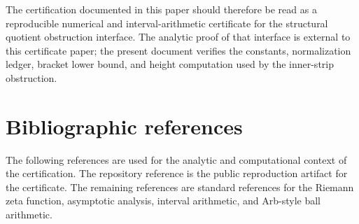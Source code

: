 \documentclass[11pt]{article}
\begin{document}
The certification documented in this paper should therefore be read as a
reproducible numerical and interval-arithmetic certificate for the structural
quotient obstruction interface.  The analytic proof of that interface is
external to this certificate paper; the present document verifies the constants,
normalization ledger, bracket lower bound, and height computation used by the
inner-strip obstruction.

\section{Bibliographic references}

The following references are used for the analytic and computational context
of the certification.  The repository reference is the public reproduction
artifact for the certificate.  The remaining references are standard references
for the Riemann zeta function, asymptotic analysis, interval arithmetic, and
Arb-style ball arithmetic.
\end{document}

